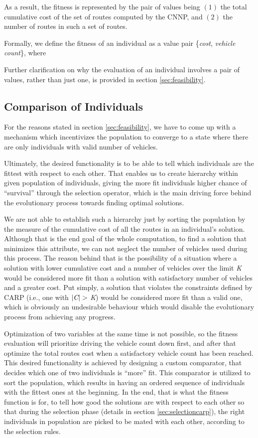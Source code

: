 \documentclass[twoside]{ctuthesis}
\theoremstyle{plain}
\theoremstyle{definition}
\theoremstyle{note}
\begin{document}
As a result, the fitness is represented by the pair of values being \emph{$(1)$} the total cumulative cost of the set of routes computed by the CNNP, and \emph{$(2)$} the number of routes in such a set of routes. 

Formally, we define the fitness of an individual as a value pair \{\emph{cost}, \emph{vehicle count}\}, where


Further clarification on why the evaluation of an individual involves a pair of values, rather than just one, is provided in section \ref{sec:feasibility}.


\subsection{Comparison of Individuals}
\label{sec:sorting}
For the reasons stated in section \ref{sec:feasibility}, we have to come up with a mechanism which incentivizes the population to converge to a state where there are only individuals with valid number of vehicles.

Ultimately, the desired functionality is to be able to tell which individuals are the fittest with respect to each other. That enables us to create hierarchy within given population of individuals, giving the more fit individuals higher chance of ``survival'' through the selection operator, which is the main driving force behind the evolutionary process towards finding optimal solutions.

We are not able to establish such a hierarchy just by sorting the population by the measure of the cumulative cost of all the routes in an individual's solution. Although that is the end goal of the whole computation, to find a solution that minimizes this attribute, we can not neglect the number of vehicles used during this process. The reason behind that is the possibility of a situation where a solution with lower cumulative cost and a number of vehicles over the limit \emph{K} would be considered more fit than a solution with satisfactory number of vehicles and a greater cost. Put simply, a solution that violates the constraints defined by CARP (i.e., one with $|\emph{C}| > $ \emph{K}) would be considered more fit than a valid one, which is obviously an undesirable behaviour which would disable the evolutionary process from achieving any progress.

Optimization of two variables at the same time is not possible, so the fitness evaluation will prioritize driving the vehicle count down first, and after that optimize the total routes cost when a satisfactory vehicle count has been reached.
This desired functionality is achieved by designing a custom comparator, that decides which one of two individuals is ``more'' fit. This comparator is utilized to sort the population, which results in having an ordered sequence of individuals with the fittest ones at the beginning. In the end, that is what the fitness function is for, to tell how good the solutions are with respect to each other so that during the selection phase (details in section \ref{sec:selectioncarp}), the right individuals in population are picked to be mated with each other, according to the selection rules. 
\end{document}
